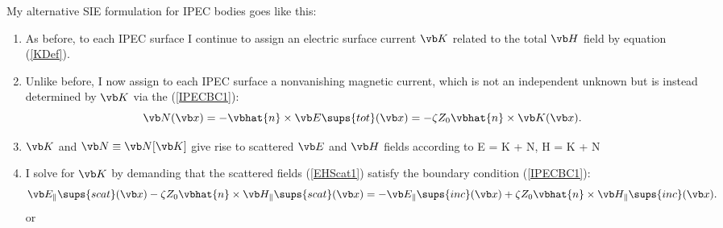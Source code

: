 \documentclass{article}
\newcommand{\BG}{\vbGamma}
\begin{document}
My alternative SIE formulation for IPEC bodies goes like this:
%
\begin{enumerate}
 \item As before, to each IPEC surface I continue to assign an electric
       surface current $\vb K$ related to the total $\vb H$ field 
       by equation (\ref{KDef}).
 \item Unlike before, I now assign to each IPEC
       surface a nonvanishing magnetic current, which is
       not an independent unknown but is instead
       determined by $\vb K$ via the (\ref{IPECBC1}):
       $$\vb N(\vb x) = -\vbhat{n}\times \vb E\sups{tot}(\vb x)
                      = -\zeta Z_0 \vbhat{n}\times \vb K(\vb x).
       $$
 \item $\vb K$ and $\vb N\equiv \vb N[\vb K]$ give rise to scattered $\vb E$ and 
       $\vb H$ fields according to
       { \vb E =
           \BG{} \star \vb K
          +\BG{} \star \vb N,
          \qquad
         \vb H =
          \BG{} \star \vb K
         +\BG{} \star \vb N
       }
 \item I solve for $\vb K$ by demanding that the scattered fields
       (\ref{EHScat1})
       satisfy the boundary condition (\ref{IPECBC1}):
       $$
           \vb E_{\parallel}\sups{scat}(\vb x) 
            -\zeta Z_0 \vbhat{n}\times \vb H_{\parallel}\sups{scat}(\vb x)
       = 
          -\vb E_{\parallel}\sups{inc}(\vb x) 
            +\zeta Z_0 \vbhat{n}\times \vb H_{\parallel}\sups{inc}(\vb x).
       $$
       or
       \begin{align*}

\end{align*}
\end{enumerate}
\end{document}
